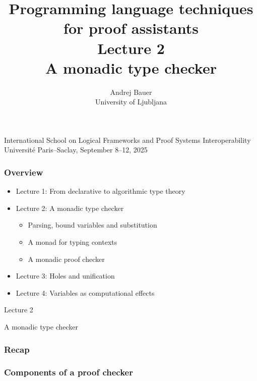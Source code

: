 \documentclass[10pt]{beamer}
\title{Programming language techniques \\for proof assistants\\[2ex]Lecture 2\\A monadic type checker}
\author{Andrej Bauer\\University of Ljubljana}
\date{}
\begin{document}
\begin{frame}
\hbox{}\vfil

\titlepage

\vfil

\begin{center}
\footnotesize
International School on Logical Frameworks and Proof Systems Interoperability \\
Université Paris--Saclay, September 8--12, 2025
\end{center}

\end{frame}


\begin{frame}
  \frametitle{Overview}

  \begin{itemize}
  \item \textcolor{grayoutColor}{Lecture 1: From declarative to algorithmic type theory}
  \item
    Lecture 2: A monadic type checker
    \begin{itemize}\footnotesize
    \item Parsing, bound variables and substitution
    \item A monad for typing contexts
    \item A monadic proof checker
    \end{itemize}
  \item
    \textcolor{grayoutColor}{Lecture 3: Holes and unification}
  \item
    \textcolor{grayoutColor}{Lecture 4: Variables as computational effects}
  \end{itemize}
\end{frame}

\begin{frame}
  \begin{center}
    \Huge Lecture 2

    \bigskip

    \Large
    A monadic type checker
  \end{center}
\end{frame}

\begin{frame}
  \frametitle{Recap}
\end{frame}


\begin{frame}
  \frametitle{Components of a proof checker}
\end{frame}
\end{document}
